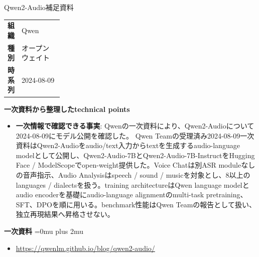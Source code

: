\begin{technicalnote}{Qwen2-Audio}{補足資料}
\begingroup
\begin{tabularx}{\linewidth}{@{}>{\bfseries}p{0.22\linewidth}X@{}}
組織 & Qwen \\
種別 & オープンウェイト \\
時系列 & 2024-08-09 \\
\end{tabularx}
\smallskip
{\bfseries 一次資料から整理したtechnical points}
\begin{itemize}[leftmargin=1.5em,itemsep=0.35em]
\item \textbf{一次情報で確認できる事実}: Qwenの一次資料により、Qwen2-Audioについて2024-08-09にモデル公開を確認した。 Qwen Teamの受理済み2024-08-09一次資料はQwen2-Audioをaudio/text入力からtextを生成するaudio-language modelとして公開し、Qwen2-Audio-7BとQwen2-Audio-7B-InstructをHugging Face / ModelScopeでopen-weight提供した。Voice Chatは別ASR moduleなしの音声指示、Audio Analysisはspeech / sound / musicを対象とし、8以上のlanguages / dialectsを扱う。training architectureはQwen language modelとaudio encoderを基礎にaudio-language alignmentのmulti-task pretraining、SFT、DPOを順に用いる。benchmark性能はQwen Teamの報告として扱い、独立再現結果へ昇格させない。
\end{itemize}
\begin{minipage}{\linewidth}
\begin{samepage}
{\bfseries 一次資料}
\begingroup\sloppy
\Urlmuskip=0mu plus 2mu\relax
\begin{itemize}[leftmargin=1.5em,itemsep=0.25em]
\item {\scriptsize\url{https://qwenlm.github.io/blog/qwen2-audio/}}
\end{itemize}
\endgroup
\end{samepage}
\end{minipage}
\endgroup
\end{technicalnote}
\medskip

